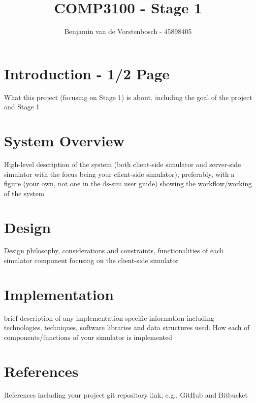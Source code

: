 \documentclass{article}
\title{COMP3100 - Stage 1}
\author{Benjamin van de Vorstenbosch - 45898405}
\begin{document}
\maketitle
\section{Introduction - 1/2 Page}
\begin{itshape}
What this project (focusing on Stage 1) is about, including the goal of the project and Stage 1
\end{itshape}

\section{System Overview}
\begin{itshape}
High-level description of the system (both client-side simulator and server-side simulator with the focus being your client-side simulator), preferably, with a figure (your own, not one in the ds-sim user guide) showing the workflow/working of the system
\end{itshape}

\section{Design}
\begin{itshape}
Design philosophy, considerations and constraints, functionalities of each simulator component focusing on the client-side simulator
\end{itshape}

\section{Implementation}
\begin{itshape}
brief description of any implementation specific information including
technologies, techniques, software libraries and data structures used. How each of components/functions
of your simulator is implemented
\end{itshape}
\section{References}
\begin{itshape}
References including your project git repository link, e.g., GitHub and Bitbucket
\end{itshape}

\raggedright
\nocite{*}
\printbibliography[]
\end{document}
